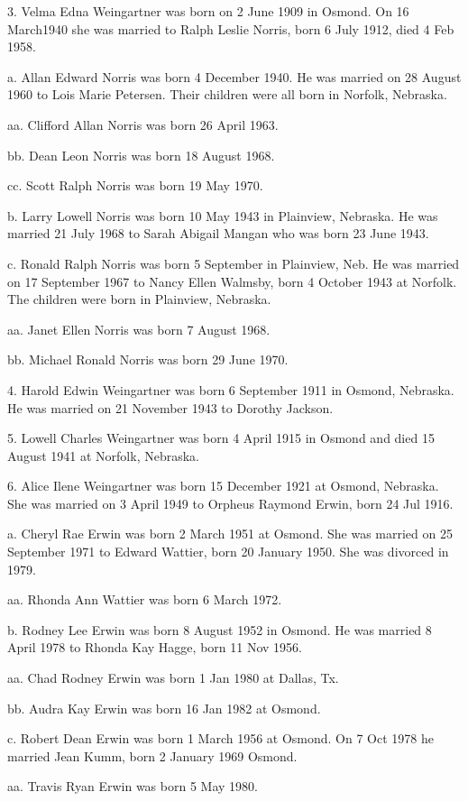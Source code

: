 \documentclass[a4paper]{article}
\begin{document}
3. Velma Edna Weingartner was born on 2 June 1909 in Osmond.  On 16 March1940 she was married to Ralph Leslie Norris, born 6 July 1912, died 4 Feb 1958.

a. Allan Edward Norris was born 4 December 1940.  He was married on 28 August 1960 to Lois Marie Petersen.  Their children were all born in Norfolk, Nebraska.

aa. Clifford Allan Norris was born 26 April 1963.

bb. Dean Leon Norris was born 18 August 1968.

cc. Scott Ralph Norris was born 19 May 1970.

b. Larry Lowell Norris was  born 10 May 1943 in Plainview, Nebraska. He was married 21 July 1968 to Sarah Abigail Mangan who was born 23 June 1943.

c. Ronald Ralph Norris was born 5 September in Plainview, Neb. He was married on 17 September 1967 to Nancy Ellen Walmsby, born 4 October 1943 at Norfolk.  The children were born in Plainview, Nebraska.

aa. Janet Ellen Norris was born 7 August 1968.

bb. Michael Ronald Norris was born 29 June 1970.

4. Harold Edwin Weingartner was born 6 September 1911 in Osmond, Nebraska. He was married on 21 November 1943 to Dorothy Jackson.

5. Lowell Charles Weingartner was born 4 April 1915 in Osmond and died 15 August 1941 at Norfolk, Nebraska.

6. Alice Ilene Weingartner was born 15 December 1921 at Osmond, Nebraska. She was married on 3 April 1949 to Orpheus Raymond Erwin, born 24 Jul 1916.

a. Cheryl Rae Erwin was born 2 March 1951 at Osmond.  She was married on 25 September 1971 to Edward Wattier, born 20 January 1950. She was divorced in 1979.

aa. Rhonda Ann Wattier was born 6 March 1972.

b. Rodney Lee Erwin was born 8 August 1952 in Osmond.  He was married 8 April 1978 to Rhonda Kay Hagge, born 11 Nov 1956.

aa. Chad Rodney Erwin was born 1 Jan 1980 at Dallas, Tx.

bb. Audra Kay Erwin was born 16 Jan 1982 at Osmond.

c. Robert Dean Erwin was born 1 March 1956 at Osmond. On 7 Oct 1978 he married Jean Kumm, born 2 January 1969 Osmond.

aa. Travis Ryan Erwin was born 5 May 1980.
\end{document}
